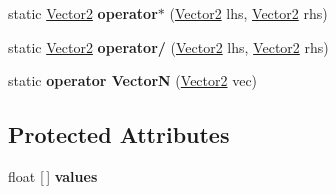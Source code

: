 \begin{DoxyCompactItemize}
static \hyperlink{class_pillar3_d_1_1_vector2}{Vector2} {\bfseries operator$\ast$} (\hyperlink{class_pillar3_d_1_1_vector2}{Vector2} lhs, \hyperlink{class_pillar3_d_1_1_vector2}{Vector2} rhs)
\item 
\mbox{\label{class_pillar3_d_1_1_vector2_afa7a1c76666e197aacc2d7f39a48a8a3}} 
static \hyperlink{class_pillar3_d_1_1_vector2}{Vector2} {\bfseries operator/} (\hyperlink{class_pillar3_d_1_1_vector2}{Vector2} lhs, \hyperlink{class_pillar3_d_1_1_vector2}{Vector2} rhs)
\item 
\mbox{\label{class_pillar3_d_1_1_vector2_aa55afe61c388d745cb7d5ce1edd7cec3}} 
static {\bfseries operator VectorN} (\hyperlink{class_pillar3_d_1_1_vector2}{Vector2} vec)
\end{DoxyCompactItemize}
\subsection*{Protected Attributes}
\begin{DoxyCompactItemize}
\item 
\mbox{\label{class_pillar3_d_1_1_vector2_afe7a030f2afef34cf9a622ac32bfdab6}} 
float \mbox{[}$\,$\mbox{]} {\bfseries values}
\end{DoxyCompactItemize}
